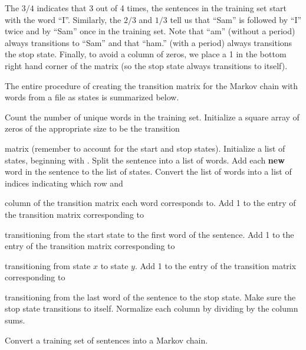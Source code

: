 The $3/4$ indicates that 3 out of 4 times, the sentences in the training set start with the word ``I''.
Similarly, the $2/3$ and $1/3$ tell us that ``Sam'' is followed by ``I'' twice and by ``Sam'' once in the training set.
Note that ``am'' (without a period) always transitions to ``Sam'' and that ``ham.'' (with a period) always transitions the stop state.
Finally, to avoid a column of zeros, we place a 1 in the bottom right hand corner of the matrix (so the stop state always transitions to itself).

The entire procedure of creating the transition matrix for the Markov chain with words from a file as states is summarized below.

\begin{algorithm} %
\begin{algorithmic}[1]
\State Count the number of unique words in the training set.
\State Initialize a square array of zeros of the appropriate size to be the transition \par\quad matrix (remember to account for the start and stop states).
\State Initialize a list of states, beginning with .
    \State Split the sentence into a list of words.
    \State Add each \textbf{new} word in the sentence to the list of states.
    \State Convert the list of words into a list of indices indicating which row and \par\qquad\enspace column of the transition matrix each word corresponds to.
    \State Add 1 to the entry of the transition matrix corresponding to
    \par\qquad\enspace transitioning from the start state to the first word of the sentence.
        \State Add 1 to the entry of the transition matrix corresponding to \par\qquad\qquad transitioning from state $x$ to state $y$.
    \EndFor
    \State Add 1 to the entry of the transition matrix corresponding to
    \par\qquad\enspace transitioning from the last word of the sentence to the stop state.
\EndFor
\State Make sure the stop state transitions to itself.
\State Normalize each column by dividing by the column sums.
\EndProcedure
\end{algorithmic}
\caption{Convert a training set of sentences into a Markov chain.}
\label{alg:MarkovSentencesTransitionMatrix}
\end{algorithm}

